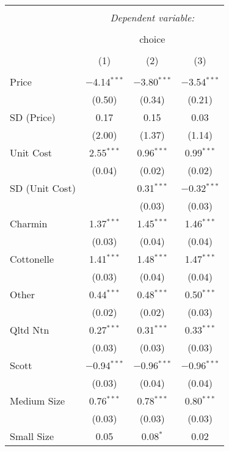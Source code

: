 
\begin{table}[!htbp] \centering
  \caption{}
  \label{tab:mnlDallasRand}
\begin{tabular}{@{\extracolsep{5pt}}lccc}
\\[-1.8ex]\hline
\hline \\[-1.8ex]
 & \multicolumn{3}{c}{\textit{Dependent variable:}} \\
\cline{2-4}
\\[-1.8ex] & \multicolumn{3}{c}{choice} \\
\\[-1.8ex] & (1) & (2) & (3)\\
\hline \\[-1.8ex]
 Price & $-$4.14$^{***}$ & $-$3.80$^{***}$ & $-$3.54$^{***}$ \\
  & (0.50) & (0.34) & (0.21) \\
   SD (Price) & 0.17 & 0.15 & 0.03 \\
  & (2.00) & (1.37) & (1.14) \\
 Unit Cost & 2.55$^{***}$ & 0.96$^{***}$ & 0.99$^{***}$ \\
  & (0.04) & (0.02) & (0.02) \\
   SD (Unit Cost) &  & 0.31$^{***}$ & $-$0.32$^{***}$ \\
  &  & (0.03) & (0.03) \\
 Charmin & 1.37$^{***}$ & 1.45$^{***}$ & 1.46$^{***}$ \\
  & (0.03) & (0.04) & (0.04) \\
 Cottonelle & 1.41$^{***}$ & 1.48$^{***}$ & 1.47$^{***}$ \\
  & (0.03) & (0.04) & (0.04) \\
 Other & 0.44$^{***}$ & 0.48$^{***}$ & 0.50$^{***}$ \\
  & (0.02) & (0.02) & (0.03) \\
 Qltd Ntn & 0.27$^{***}$ & 0.31$^{***}$ & 0.33$^{***}$ \\
  & (0.03) & (0.03) & (0.03) \\
 Scott & $-$0.94$^{***}$ & $-$0.96$^{***}$ & $-$0.96$^{***}$ \\
  & (0.03) & (0.04) & (0.04) \\
 Medium Size & 0.76$^{***}$ & 0.78$^{***}$ & 0.80$^{***}$ \\
  & (0.03) & (0.03) & (0.03) \\
 Small Size & 0.05 & 0.08$^{*}$ & 0.02 \\

\end{tabular}
\end{table}
